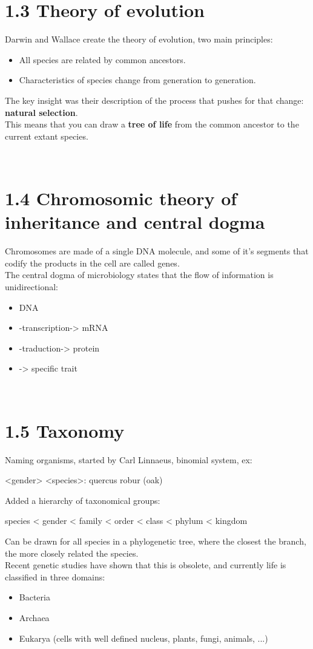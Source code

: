 \documentclass[a4paper,landscape,10pt]{cheatsheet}
\begin{document}
\section{1.3 Theory of evolution}
Darwin and Wallace create the theory of evolution, two main principles:
\begin{itemize}
      \item All species are related by common ancestors.
      \item Characteristics of species change from generation to generation.
\end{itemize}
The key insight was their description of the process that pushes for that change: \textbf{natural selection}.\\
This means that you can draw a \textbf{tree of life} from the common ancestor to the current extant species.

\hfill\\
\section{1.4 Chromosomic theory of inheritance and central dogma}
Chromosomes are made of a single DNA molecule, and some of it's segments that codify the products in the cell are called
genes.\\
The central dogma of microbiology states that the flow of information is unidirectional:
\begin{itemize}
      \item DNA
      \item -transcription-> mRNA
      \item -traduction-> protein
      \item -> specific trait
\end{itemize}

\hfill\\
\section{1.5 Taxonomy}
Naming organisms, started by Carl Linnaeus, binomial system, ex:\\
\begin{center}
      <gender> <species>: quercus robur (oak)
\end{center}
Added a hierarchy of taxonomical groups:\\
\begin{center}
      species < gender < family < order < class < phylum < kingdom
\end{center}
Can be drawn for all species in a phylogenetic tree, where the closest the branch, the more closely related the
species.\\
Recent genetic studies have shown that this is obsolete, and currently life is classified in three domains:
\begin{itemize}
      \item Bacteria
      \item Archaea
      \item Eukarya (cells with well defined nucleus, plants, fungi, animals, ...)
\end{itemize}
\end{document}
